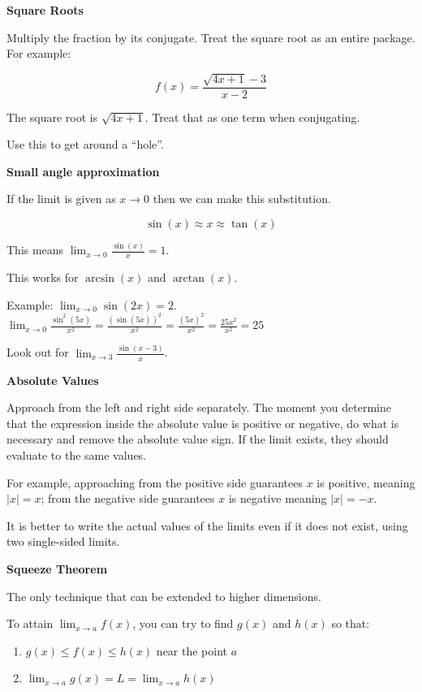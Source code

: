 \documentclass[
]{article}
\newcounter{example}
\begin{document}
\textbf{Square Roots}

Multiply the fraction by its conjugate. Treat the square root as an
entire package. For example:

$$f(x) = \frac{\sqrt{4x + 1} - 3}{x - 2}$$

The square root is $\sqrt{4x + 1}$. Treat that as one term when
conjugating.

Use this to get around a ``hole''.

\textbf{Small angle approximation}

If the limit is given as $x \rightarrow 0$ then we can make this
substitution.

$$\sin(x) \approx x \approx \tan(x)$$

This means $\lim_{x \rightarrow 0}{\frac{\sin(x)}{x} = 1}$.

This works for $\arcsin(x)$ and $\arctan(x)$.

Example: $\lim_{x \rightarrow 0}{\sin(2x)} = 2$.
$\lim_{x \rightarrow 0}{\frac{\sin^{2}(5x)}{x^{2}} = \frac{\left( \sin(5x) \right)^{2}}{x^{2}}} = \frac{(5x)^{2}}{x^{2}} = \frac{25x^{2}}{x^{2}} = 25$

Look out for $\lim_{x \rightarrow 3}\frac{\sin(x - 3)}{x}$.

\textbf{Absolute Values}

Approach from the left and right side separately. The moment you
determine that the expression inside the absolute value is positive or
negative, do what is necessary and remove the absolute value sign. If
the limit exists, they should evaluate to the same values.

For example, approaching from the positive side guarantees $x$ is
positive, meaning $|x| = x$; from the negative side guarantees $x$
is negative meaning $|x| = - x$.

It is better to write the actual values of the limits even if it does
not exist, using two single-sided limits.

\textbf{Squeeze Theorem}

The only technique that can be extended to higher dimensions.

To attain $\lim_{x \rightarrow a}{f(x)}$, you can try to find $g(x)$
and $h(x)$ so that:

\begin{enumerate}
\def\labelenumi{\arabic{enumi}.}
\item
  $g(x) \leq f(x) \leq h(x)$ near the point $a$
\item
  $\lim_{x \rightarrow a}{g(x) = L = \lim_{x \rightarrow a}{h(x)}}$
\end{enumerate}
\end{document}
